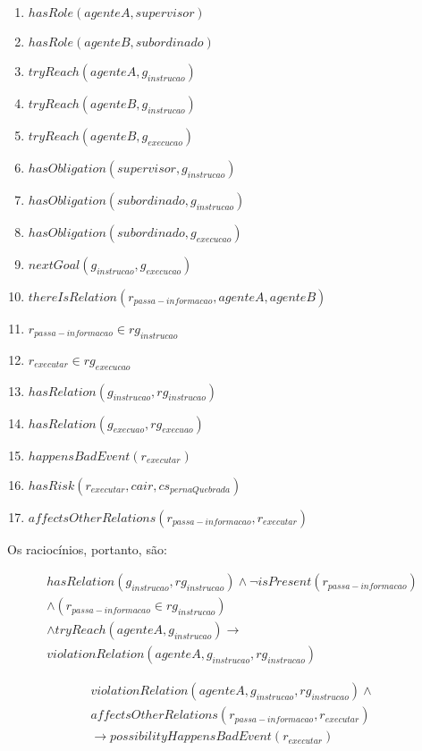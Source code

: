 \begin{enumerate}
	\item $hasRole(agenteA,supervisor)$ 
	\item $hasRole(agenteB,subordinado)$
    \item $tryReach(agenteA,g_{instrucao})$
    \item $tryReach(agenteB,g_{instrucao})$
    \item $tryReach(agenteB,g_{execucao})$
	\item $hasObligation(supervisor,g_{instrucao})$
	\item $hasObligation(subordinado,g_{instrucao})$
	\item $hasObligation(subordinado,g_{execucao})$
	\item $nextGoal(g_{instrucao},g_{execucao})$	
    \item $thereIsRelation(r_{passa-informacao},agenteA,agenteB)$
    \item $r_{passa-informacao} \in rg_{instrucao}$
    \item $r_{executar} \in rg_{execucao}$    
    \item $hasRelation(g_{instrucao},rg_{instrucao})$
    \item $hasRelation(g_{execuao},rg_{execuao})$
    \item $happensBadEvent(r_{executar})$
    \item $hasRisk(r_{executar}, cair, cs_{pernaQuebrada})$
    \item $affectsOtherRelations(r_{passa-informacao},r_{executar})$
\end{enumerate}

Os raciocínios, portanto, são: 


\begin{eqnarray}\label{refutmoisea}\nonumber
	hasRelation(g_{instrucao},rg_{instrucao}) \wedge \neg isPresent(r_{passa-informacao}) \\ \nonumber 
    \wedge (r_{passa-informacao} \in rg_{instrucao}) \\ \nonumber
    \wedge tryReach(agenteA,g_{instrucao}) \to \nonumber \\
	violationRelation(agenteA,g_{instrucao},rg_{instrucao})
\end{eqnarray}


\begin{eqnarray}\label{refutmoiseb}
	violationRelation(agenteA,g_{instrucao},rg_{instrucao}) \wedge  \nonumber \\
    affectsOtherRelations(r_{passa-informacao},r_{executar}) \nonumber \\
    \to possibilityHappensBadEvent(r_{executar}) 
\end{eqnarray}


